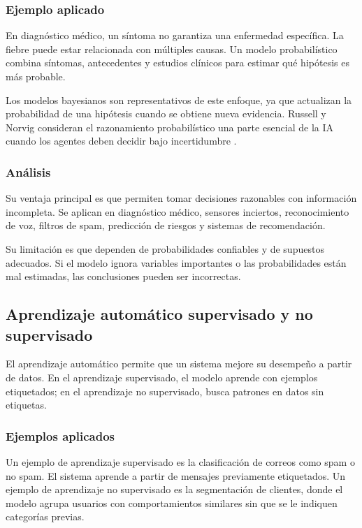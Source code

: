 \subsubsection{Ejemplo aplicado}

En diagnóstico médico, un síntoma no garantiza una enfermedad específica. La fiebre puede estar relacionada con múltiples causas. Un modelo probabilístico combina síntomas, antecedentes y estudios clínicos para estimar qué hipótesis es más probable.

Los modelos bayesianos son representativos de este enfoque, ya que actualizan la probabilidad de una hipótesis cuando se obtiene nueva evidencia. Russell y Norvig consideran el razonamiento probabilístico una parte esencial de la IA cuando los agentes deben decidir bajo incertidumbre \cite{russell2012}.

\subsubsection{Análisis}

Su ventaja principal es que permiten tomar decisiones razonables con información incompleta. Se aplican en diagnóstico médico, sensores inciertos, reconocimiento de voz, filtros de spam, predicción de riesgos y sistemas de recomendación.

Su limitación es que dependen de probabilidades confiables y de supuestos adecuados. Si el modelo ignora variables importantes o las probabilidades están mal estimadas, las conclusiones pueden ser incorrectas.

\subsection{Aprendizaje automático supervisado y no supervisado}

El aprendizaje automático permite que un sistema mejore su desempeño a partir de datos. En el aprendizaje supervisado, el modelo aprende con ejemplos etiquetados; en el aprendizaje no supervisado, busca patrones en datos sin etiquetas.

\subsubsection{Ejemplos aplicados}

Un ejemplo de aprendizaje supervisado es la clasificación de correos como spam o no spam. El sistema aprende a partir de mensajes previamente etiquetados. Un ejemplo de aprendizaje no supervisado es la segmentación de clientes, donde el modelo agrupa usuarios con comportamientos similares sin que se le indiquen categorías previas.

